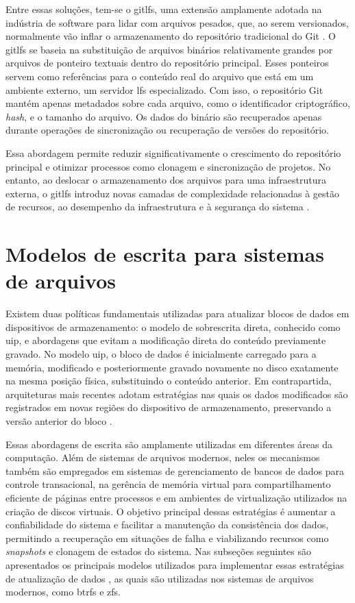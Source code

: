 Entre essas soluções, tem-se o \gls{gitlfs}, uma extensão amplamente adotada na indústria de software para lidar com arquivos pesados, que, ao serem versionados, normalmente vão inflar o armazenamento do repositório tradicional do Git \cite{Chen2025}. O \gls{gitlfs} se baseia na substituição de arquivos binários relativamente grandes por arquivos de ponteiro textuais dentro do repositório principal. Esses ponteiros servem como referências para o conteúdo real do arquivo que está em um ambiente externo, um servidor \gls{lfs} especializado. Com isso, o repositório Git mantém apenas metadados sobre cada arquivo, como o identificador criptográfico, \textit{hash}, e o tamanho do arquivo. Os dados do binário são recuperados apenas durante operações de sincronização ou recuperação de versões do repositório.

Essa abordagem permite reduzir significativamente o crescimento do repositório principal e otimizar processos como clonagem e sincronização de projetos. No entanto, ao deslocar o armazenamento dos arquivos para uma infraestrutura externa, o \gls{gitlfs} introduz novas camadas de complexidade relacionadas à gestão de recursos, ao desempenho da infraestrutura e à segurança do sistema \cite{Chen2025}.

\section{Modelos de escrita para sistemas de arquivos}

Existem duas políticas fundamentais utilizadas para atualizar blocos de dados em dispositivos de armazenamento: o modelo de sobrescrita direta, conhecido como \gls{uip}, e abordagens que evitam a modificação direta do conteúdo previamente gravado. No modelo \gls{uip}, o bloco de dados é inicialmente carregado para a memória, modificado e posteriormente gravado novamente no disco exatamente na mesma posição física, substituindo o conteúdo anterior. Em contrapartida, arquiteturas mais recentes adotam estratégias nas quais os dados modificados são registrados em novas regiões do dispositivo de armazenamento, preservando a versão anterior do bloco \cite{Chen2014}.

Essas abordagens de escrita são amplamente utilizadas em diferentes áreas da computação. Além de sistemas de arquivos modernos, neles os mecanismos também são empregados em sistemas de gerenciamento de bancos de dados para controle transacional, na gerência de memória virtual para compartilhamento eficiente de páginas entre processos e em ambientes de virtualização utilizados na criação de discos virtuais. O objetivo principal dessas estratégias é aumentar a confiabilidade do sistema e facilitar a manutenção da consistência dos dados, permitindo a recuperação em situações de falha e viabilizando recursos como \textit{snapshots} e clonagem de estados do sistema. Nas subseções seguintes são apresentados os principais modelos utilizados para implementar essas estratégias de atualização de dados \cite{Xiao2009}, as quais são utilizadas nos sistemas de arquivos modernos, como \gls{btrfs} e \gls{zfs}.

